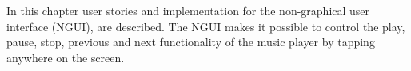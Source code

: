 In this chapter user stories and implementation for the non-graphical user interface (NGUI), are described. The NGUI makes it possible to control the play, pause, stop, previous and next functionality of the music player by tapping anywhere on the screen.


